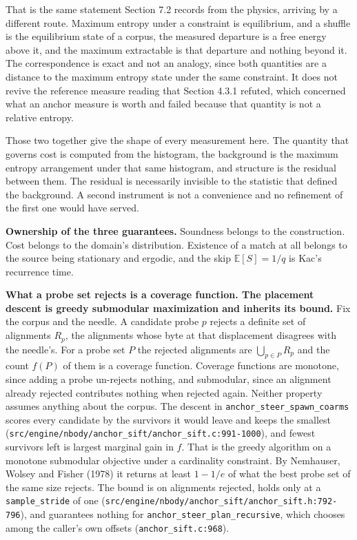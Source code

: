 That is the same statement Section 7.2 records from the physics, arriving by a different route. Maximum entropy under a constraint is equilibrium, and a shuffle is the equilibrium state of a corpus, the measured departure is a free energy above it, and the maximum extractable is that departure and nothing beyond it. The correspondence is exact and not an analogy, since both quantities are a distance to the maximum entropy state under the same constraint. It does not revive the reference measure reading that Section 4.3.1 refuted, which concerned what an anchor measure is worth and failed because that quantity is not a relative entropy.

Those two together give the shape of every measurement here. The quantity that governs cost is computed from the histogram, the background is the maximum entropy arrangement under that same histogram, and structure is the residual between them. The residual is necessarily invisible to the statistic that defined the background. A second instrument is not a convenience and no refinement of the first one would have served.

\textbf{Ownership of the three guarantees.} Soundness belongs to the construction. Cost belongs to the domain's distribution. Existence of a match at all belongs to the source being stationary and ergodic, and the skip \(\mathbb{E}[S] = 1/q\) is Kac's recurrence time.

\textbf{What a probe set rejects is a coverage function. The placement descent is greedy submodular maximization and inherits its bound.} Fix the corpus and the needle. A candidate probe \(p\) rejects a definite set of alignments \(R_p\), the alignments whose byte at that displacement disagrees with the needle's. For a probe set \(P\) the rejected alignments are \(\bigcup_{p \in P} R_p\) and the count \(f(P)\) of them is a coverage function. Coverage functions are monotone, since adding a probe un-rejects nothing, and submodular, since an alignment already rejected contributes nothing when rejected again. Neither property assumes anything about the corpus. The descent in \texttt{anchor\_steer\_spawn\_coarms} scores every candidate by the survivors it would leave and keeps the smallest (\texttt{src/\allowbreak{}engine/\allowbreak{}nbody/\allowbreak{}anchor\_sift/\allowbreak{}anchor\_sift.c:991-1000}), and fewest survivors left is largest marginal gain in \(f\). That is the greedy algorithm on a monotone submodular objective under a cardinality constraint. By Nemhauser, Wolsey and Fisher (1978) it returns at least \(1 - 1/e\) of what the best probe set of the same size rejects. The bound is on alignments rejected, holds only at a \texttt{sample\_stride} of one (\texttt{src/\allowbreak{}engine/\allowbreak{}nbody/\allowbreak{}anchor\_sift/\allowbreak{}anchor\_sift.h:792-796}), and guarantees nothing for \texttt{anchor\_steer\_plan\_recursive}, which chooses among the caller's own offsets (\texttt{anchor\_sift.c:968}).

